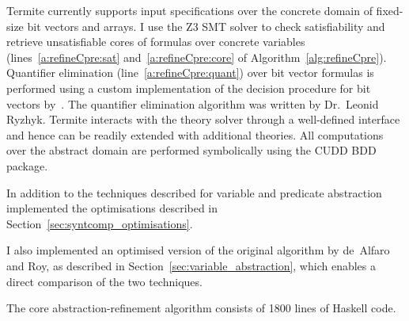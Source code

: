 Termite currently supports input specifications over the concrete domain of fixed-size bit vectors and arrays.  I use the Z3 SMT solver to check satisfiability and retrieve unsatisfiable cores of formulas over concrete variables (lines~\ref{a:refineCpre:sat} and~\ref{a:refineCpre:core} of Algorithm~\ref{alg:refineCpre}).  Quantifier elimination (line~\ref{a:refineCpre:quant}) over bit vector formulas is performed using a custom implementation of the decision procedure for bit vectors by~\cite{Barrett_DL_98}. The quantifier elimination algorithm was written by Dr.\ Leonid Ryzhyk. Termite interacts with the theory solver through a well-defined interface and hence can be readily extended with additional theories.  All computations over the abstract domain are performed symbolically using the CUDD BDD package.  

In addition to the techniques described for variable and predicate abstraction implemented the optimisations described in Section~\ref{sec:syntcomp_optimisations}.

I also implemented an optimised version of the original algorithm by de~Alfaro and Roy, as described in Section~\ref{sec:variable_abstraction}, which enables a direct comparison of the two techniques.

The core abstraction-refinement algorithm consists of 1800 lines of Haskell code.

